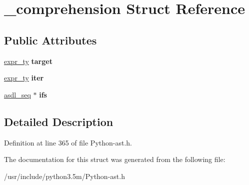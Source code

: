 \hypertarget{struct__comprehension}{}\section{\+\_\+comprehension Struct Reference}
\label{struct__comprehension}
\subsection*{Public Attributes}
\begin{DoxyCompactItemize}
\item 
\hyperlink{struct__expr}{expr\+\_\+ty} {\bfseries target}\hypertarget{struct__comprehension_a810b2152a85f7ba984e54207d59d8124}{}\label{struct__comprehension_a810b2152a85f7ba984e54207d59d8124}

\item 
\hyperlink{struct__expr}{expr\+\_\+ty} {\bfseries iter}\hypertarget{struct__comprehension_ab351ea193dabc5c156b6c571f7f80681}{}\label{struct__comprehension_ab351ea193dabc5c156b6c571f7f80681}

\item 
\hyperlink{structasdl__seq}{asdl\+\_\+seq} $\ast$ {\bfseries ifs}\hypertarget{struct__comprehension_abe4e5448c7e19c25ced95cf7027df493}{}\label{struct__comprehension_abe4e5448c7e19c25ced95cf7027df493}

\end{DoxyCompactItemize}


\subsection{Detailed Description}


Definition at line 365 of file Python-\/ast.\+h.



The documentation for this struct was generated from the following file\+:\begin{DoxyCompactItemize}
\item 
/usr/include/python3.\+5m/Python-\/ast.\+h\end{DoxyCompactItemize}
